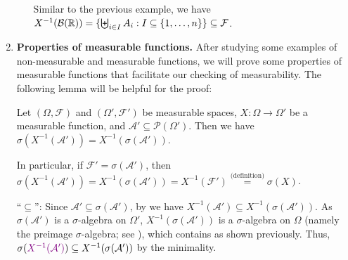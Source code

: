 \begin{enumerate}
\begin{enumerate}[label={(\arabic*)}]
\begin{pf}
Similar to the previous example, we have
\(X^{-1}(\mathcal{B}(\mathbb{R}))=\{\biguplus_{i\in I}^{}A_i:I\subseteq
\{1,\dotsc,n\}\}\subseteq \mathcal{F}\).
\end{pf}
\end{enumerate}
\item \textbf{Properties of measurable functions.} After studying some examples
of non-measurable and measurable functions, we will prove some properties of
measurable functions that facilitate our checking of measurability. The
following lemma will be helpful for the proof:
\begin{lemma}
\label{lma:sig-alg-gen-preimg-comm}
Let \((\Omega,\mathcal{F})\) and \((\Omega',\mathcal{F}')\) be measurable
spaces, \(X:\Omega\to\Omega'\) be a measurable function, and
\(\mathcal{A}'\subseteq \mathcal{P}(\Omega')\). Then we have
\(\sigma(X^{-1}(\mathcal{A}'))=X^{-1}(\sigma(\mathcal{A}'))\).
\begin{note}
In particular, if \(\mathcal{F}'=\sigma(\mathcal{A}')\), then
\(\sigma(X^{-1}(\mathcal{A}'))
=X^{-1}(\sigma(\mathcal{A}'))=X^{-1}(\mathcal{F}')\overset{\text{(definition)}}{=}\sigma(X)\).
\end{note}
\end{lemma}
\begin{pf}
``\(\subseteq\)'': Since \(\mathcal{A}'\subseteq \sigma(\mathcal{A}')\), by
 we have \(X^{-1}(\mathcal{A}')\subseteq
X^{-1}(\sigma(\mathcal{A}'))\).  As \(\sigma(\mathcal{A}')\) is a
\(\sigma\)-algebra on \(\Omega'\), \(X^{-1}(\sigma(\mathcal{A}'))\) is a
\(\sigma\)-algebra on \(\Omega\) (namely the preimage \(\sigma\)-algebra; see
), which contains  as
shown previously. Thus, \(\sigma({\color{violet}X^{-1}(\mathcal{A}')})\subseteq X^{-1}(\sigma(\mathcal{A}'))\)
by the minimality.


\end{pf}
\end{enumerate}
